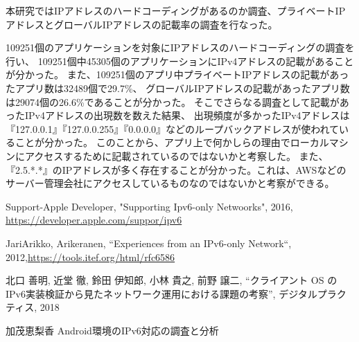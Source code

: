 \documentclass[twocolumn, 10pt, a4paper]{jarticle}
\begin{document}
本研究ではIPアドレスのハードコーディングがあるのか調査、プライベートIPアドレスとグローバルIPアドレスの記載率の調査を行なった。

109251個のアプリケーションを対象にIPアドレスのハードコーディングの調査を行い、
109251個中45305個のアプリケーションにIPv4アドレスの記載があることが分かった。
また、109251個のアプリ中プライベートIPアドレスの記載があったアプリ数は32489個で29.7\%、
グローバルIPアドレスの記載があったアプリ数は29074個の26.6\%であることが分かった。
そこでさらなる調査として記載があったIPv4アドレスの出現数を数えた結果、
出現頻度が多かったIPv4アドレスは『127.0.0.1』『127.0.0.255』『0.0.0.0』などのループバックアドレスが使われていることが分かった。
このことから、アプリ上で何かしらの理由でローカルマシンにアクセスするために記載されているのではないかと考察した。
また、『2.5.*.*』のIPアドレスが多く存在することが分かった。これは、AWSなどのサーバー管理会社にアクセスしているものなのではないかと考察ができる。




\begin{thebibliography}{20}

Support-Apple Developer, "Supporting Ipv6-only Netwoorks", 2016, \url{https://developer.apple.com/suppor/ipv6}

JariArikko, Arikeranen, “Experiences from an IPv6-only Network“, 2012,\url{https://tools.itef.org/html/rfc6586}

北口 善明, 近堂 徹, 鈴田 伊知郎, 小林 貴之, 前野 譲二, “クライアント OS の IPv6実装検証から見たネットワーク運用における課題の考察”, デジタルプラクティス, 2018

加茂恵梨香 Android環境のIPv6対応の調査と分析

\end{thebibliography}
\end{document}
